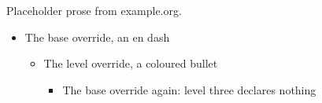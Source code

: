 \documentclass{article}
\begin{document}
Placeholder prose from example.org.

\begin{itemize}
\item The base override, an en dash
  \begin{itemize}
  \item The level override, a coloured bullet
    \begin{itemize}
    \item The base override again: level three declares nothing
    \end{itemize}
  \end{itemize}
\end{itemize}
\end{document}
